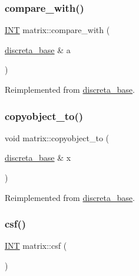 \mbox{\label{classmatrix_a6009a90834a208f5f0a83d8ed651e4c5}} 
\subsubsection{\texorpdfstring{compare\+\_\+with()}{compare\_with()}}
{\footnotesize\ttfamily \mbox{\hyperlink{galois_8h_a09fddde158a3a20bd2dcadb609de11dc}{I\+NT}} matrix\+::compare\+\_\+with (\begin{DoxyParamCaption}\item[{\mbox{\hyperlink{classdiscreta__base}{discreta\+\_\+base}} \&}]{a }\end{DoxyParamCaption})\hspace{0.3cm}{\ttfamily [virtual]}}



Reimplemented from \mbox{\hyperlink{classdiscreta__base_a3818444c4301d0b7ed47c3b850ea6c60}{discreta\+\_\+base}}.

\mbox{\label{classmatrix_a6a47f82604adaa39b21f6bfe6da9e898}} 
\subsubsection{\texorpdfstring{copyobject\+\_\+to()}{copyobject\_to()}}
{\footnotesize\ttfamily void matrix\+::copyobject\+\_\+to (\begin{DoxyParamCaption}\item[{\mbox{\hyperlink{classdiscreta__base}{discreta\+\_\+base}} \&}]{x }\end{DoxyParamCaption})\hspace{0.3cm}{\ttfamily [virtual]}}



Reimplemented from \mbox{\hyperlink{classdiscreta__base_a33180628d9ced231267229b3564790f3}{discreta\+\_\+base}}.

\mbox{\label{classmatrix_af06fd7824274febfcc10f734a06d1a6e}} 
\subsubsection{\texorpdfstring{csf()}{csf()}}
{\footnotesize\ttfamily \mbox{\hyperlink{galois_8h_a09fddde158a3a20bd2dcadb609de11dc}{I\+NT}} matrix\+::csf (\begin{DoxyParamCaption}{ }\end{DoxyParamCaption})}

